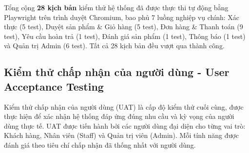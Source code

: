 Tổng cộng \textbf{28 kịch bản} kiểm thử hệ thống đã được thực thi tự động bằng Playwright trên trình duyệt Chromium, bao phủ 7 luồng nghiệp vụ chính: Xác thực (5 test), Duyệt sản phẩm \& Giỏ hàng (5 test), Đơn hàng \& Thanh toán (9 test), Yêu cầu hoàn trả (1 test), Đánh giá sản phẩm (1 test), Thông báo (1 test) và Quản trị Admin (6 test). Tất cả 28 kịch bản đều vượt qua thành công.

\subsection{Kiểm thử chấp nhận của người dùng - User Acceptance Testing}

Kiểm thử chấp nhận của người dùng (UAT) là cấp độ kiểm thử cuối cùng, được thực hiện để xác nhận hệ thống đáp ứng đúng nhu cầu và kỳ vọng của người dùng thực tế. UAT được tiến hành bởi các người dùng đại diện cho từng vai trò: Khách hàng, Nhân viên (Staff) và Quản trị viên (Admin). Mỗi tính năng được đánh giá theo tiêu chí chấp nhận đã thống nhất với người dùng.

